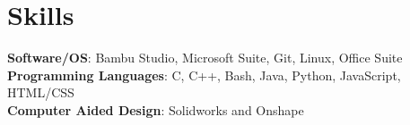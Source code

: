 \section{Skills}
 \begin{itemize}[leftmargin=0.15in, label={}]
    {\normalsize
    \item{
     \textbf{Software/OS}{: Bambu Studio, Microsoft Suite, Git, Linux, Office Suite} \\
     \textbf{Programming Languages}{: C, C++, Bash, Java, Python, JavaScript, HTML/CSS} \\
     \textbf{Computer Aided Design}{: Solidworks and Onshape} \\
    }}
\end{itemize}